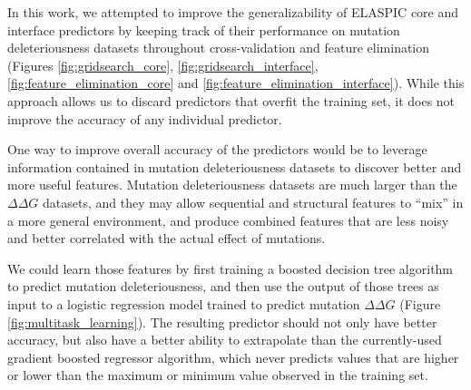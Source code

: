 In this work, we attempted to improve the generalizability of ELASPIC core and interface predictors by keeping track of their performance on mutation deleteriousness datasets throughout cross-validation and feature elimination (Figures \ref{fig:gridsearch_core}, \ref{fig:gridsearch_interface}, \ref{fig:feature_elimination_core} and \ref{fig:feature_elimination_interface}). While this approach allows us to discard predictors that overfit the training set, it does not improve the accuracy of any individual predictor.

One way to improve overall accuracy of the predictors would be to leverage information contained in mutation deleteriousness datasets to discover better and more useful features. Mutation deleteriousness datasets are much larger than the $\Delta \Delta G$ datasets, and they may allow sequential and structural features to ``mix'' in a more general environment, and produce combined features that are less noisy and better correlated with the actual effect of mutations.

We could learn those features by first training a boosted decision tree algorithm to predict mutation deleteriousness, and then use the output of those trees as input to a logistic regression model trained to predict mutation $\Delta \Delta G$ (Figure \ref{fig:multitask_learning}). The resulting predictor should not only have better accuracy, but also have a better ability to extrapolate than the currently-used gradient boosted regressor algorithm, which never predicts values that are higher or lower than the maximum or minimum value observed in the training set.

